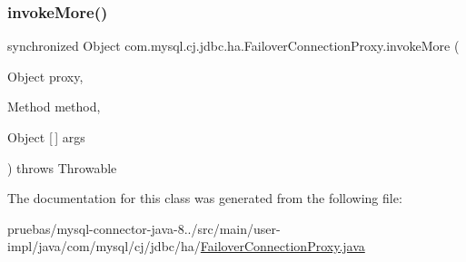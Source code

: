 \mbox{\label{classcom_1_1mysql_1_1cj_1_1jdbc_1_1ha_1_1_failover_connection_proxy_ad05c49207de1dc3e35f5f56461f70036}} 
\subsubsection{\texorpdfstring{invoke\+More()}{invokeMore()}}
{\footnotesize\ttfamily synchronized Object com.\+mysql.\+cj.\+jdbc.\+ha.\+Failover\+Connection\+Proxy.\+invoke\+More (\begin{DoxyParamCaption}\item[{Object}]{proxy,  }\item[{Method}]{method,  }\item[{Object \mbox{[}$\,$\mbox{]}}]{args }\end{DoxyParamCaption}) throws Throwable}



The documentation for this class was generated from the following file\+:\begin{DoxyCompactItemize}
\item 
pruebas/mysql-\/connector-\/java-\/8../src/main/user-\/impl/java/com/mysql/cj/jdbc/ha/\mbox{\hyperlink{_failover_connection_proxy_8java}{Failover\+Connection\+Proxy.\+java}}\end{DoxyCompactItemize}
